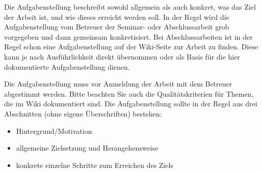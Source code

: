 \label{sec:Aufgabenstellung}

Die Aufgabenstellung beschreibt sowohl allgemein als auch konkret, was das Ziel der Arbeit ist, und wie dieses erreicht werden soll. 
In der Regel wird die Aufgabenstellung vom Betreuer der Seminar- oder Abschlussarbeit grob vorgegeben und dann gemeinsam konkretisiert. Bei Abschlussarbeiten ist in der Regel schon eine Aufgabenstellung auf der Wiki-Seite zur Arbeit zu finden. Diese kann je nach Ausführlichkeit direkt übernommen oder als Basis für die hier dokumentierte Aufgabenstellung dienen. 

Die Aufgabenstellung muss vor Anmeldung der Arbeit mit dem Betreuer abgestimmt werden. Bitte beachten Sie auch die Qualitätskriterien für Themen, die im Wiki dokumentiert sind.
Die Aufgabenstellung sollte in der Regel aus drei Abschnitten (ohne eigene Überschriften) bestehen: 

\begin{itemize}
    \item{Hintergrund/Motivation}
    \item{allgemeine Zielsetzung und Herangehensweise}
    \item{konkrete einzelne Schritte zum Erreichen des Ziels}
\end{itemize}
